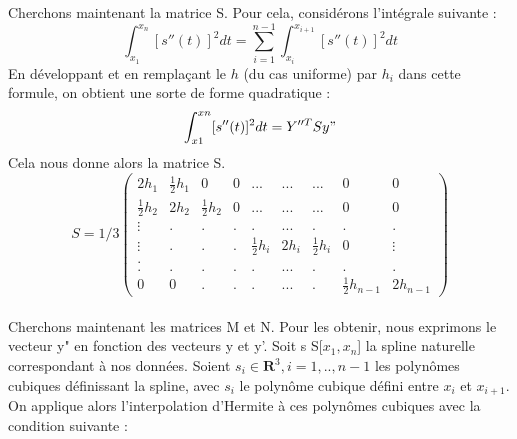 \documentclass[a4paper,12pt]{article} %
\begin{document}
                Cherchons maintenant la matrice S. Pour cela, considérons l'intégrale suivante : \\
                $$\int_{x_1}^{x_n}[s''(t)]^2dt=\sum_{i=1}^{n-1}\int_{x_i}^{x_{i+1}}[s''(t)]^2dt$$
                En développant et en remplaçant le $h$ (du cas uniforme) par $h_i$ dans cette formule, on obtient une sorte de forme quadratique : $$\int_{x1}^{xn}[s''(t)]^2dt= Y''^T S y"$$
                Cela nous donne alors la matrice S. 
                $$S=1/3\begin{pmatrix} 2h_1&\frac{1}{2}h_1&0&0&...&...&...&0&0 \\ \frac{1}{2}h_2&2h_2&\frac{1}{2}h_2&0&...&...&...&0&0 \\ \vdots&.&.&.&.&...&.&.&.\\ \vdots&.&.&.&\frac{1}{2}h_i&2h_i&\frac{1}{2}h_i&0&\vdots \\. \\.&.&.&.&.&...&.&.&. \\ 0&0&.&.&.&...&.&\frac{1}{2}h_{n-1}&2h_{n-1} \end{pmatrix}$$\\
                
                Cherchons maintenant les matrices M et N. Pour les obtenir, nous exprimons le vecteur y" en fonction des  vecteurs y et y'. Soit s \in S[$x_1,x_n$] la spline naturelle correspondant à nos données. Soient $s_i \in \textbf{R}^3,i=1,..,n-1$ les polynômes cubiques définissant la spline, avec $s_i$ le polynôme cubique défini entre $x_i$ et $x_{i+1}$. On applique alors l'interpolation d'Hermite à ces polynômes cubiques avec la condition suivante :
                
\end{document}
